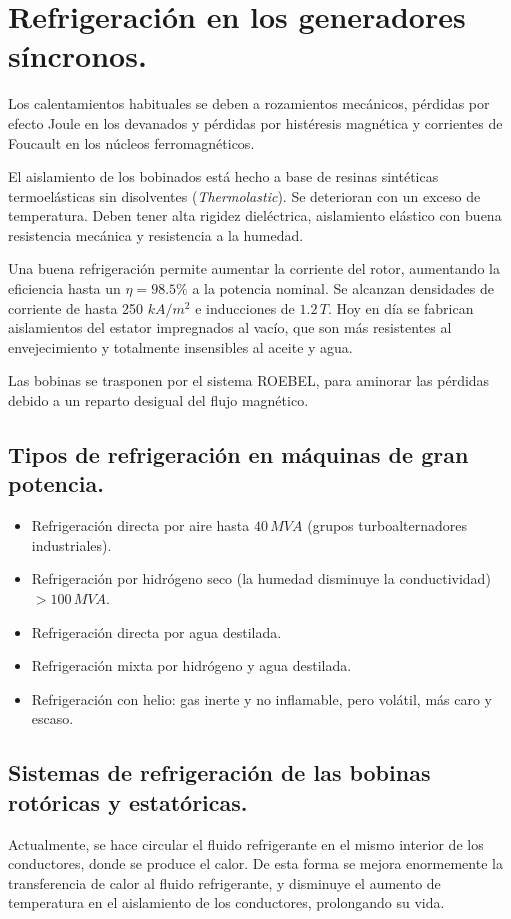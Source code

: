 	\section{Refrigeración en los generadores síncronos.}
		Los calentamientos habituales se deben a rozamientos mecánicos, pérdidas por efecto Joule en los devanados y pérdidas por histéresis magnética y corrientes de Foucault en los núcleos ferromagnéticos.
		
		
		El aislamiento de los bobinados está hecho a base de resinas sintéticas termoelásticas sin disolventes (\textit{Thermolastic}). Se deterioran con un exceso de temperatura. Deben tener alta rigidez dieléctrica, aislamiento elástico con buena resistencia mecánica y resistencia a la humedad.
		
		
		Una buena refrigeración permite aumentar la corriente del rotor, aumentando la eficiencia hasta un $\eta = 98.5\%$ a la potencia nominal. Se alcanzan densidades de corriente de hasta 250 $kA/m^2$ e inducciones de $1.2\,T$. Hoy en día se fabrican aislamientos del estator impregnados al vacío, que son más resistentes al envejecimiento y totalmente insensibles al aceite y agua.
		
		
		Las bobinas se trasponen por el sistema ROEBEL, para aminorar las pérdidas debido a un reparto desigual
		del flujo magnético.
			
		\subsection{Tipos de refrigeración en máquinas de gran potencia.}
			\begin{itemize}
				\item Refrigeración directa por aire hasta $40\,MV\!A$ (grupos turboalternadores industriales).
				\item Refrigeración por hidrógeno seco (la humedad disminuye la conductividad) $>100\,MV\!A$.
				\item Refrigeración directa por agua destilada.
				\item Refrigeración mixta por hidrógeno y agua destilada.
				\item Refrigeración con helio: gas inerte y no inflamable, pero volátil, más caro y escaso.
			\end{itemize}
			
		\subsection{Sistemas de refrigeración de las bobinas rotóricas y estatóricas.}
			Actualmente, se hace circular el fluido refrigerante en el mismo interior de los conductores, donde se produce el calor. De esta forma se mejora enormemente la transferencia de calor al fluido refrigerante, y disminuye el aumento de temperatura en el aislamiento de los conductores, prolongando su vida.
			
